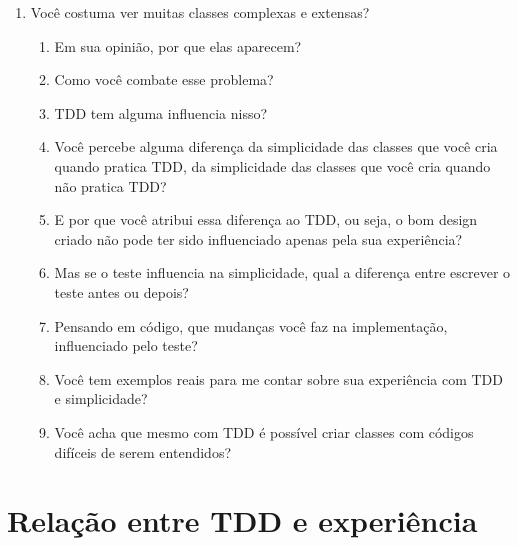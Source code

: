 \begin{enumerate}
	\item{Você costuma ver muitas classes complexas e extensas?}
		\begin{enumerate}
			\item Em sua opinião, por que elas aparecem?

			\item Como você combate esse problema?

			\item TDD tem alguma influencia nisso?
			
			\item Você percebe alguma diferença da simplicidade das classes que você cria quando
			pratica TDD, da simplicidade das classes que você cria quando não pratica TDD?
			
			\item E por que você atribui essa diferença ao TDD, ou seja, o bom design
			criado não pode ter sido influenciado apenas pela sua experiência?
			
			\item Mas se o teste influencia na simplicidade, 
			qual a diferença entre escrever o teste antes ou depois?
			
			\item Pensando em código, que mudanças você faz na implementação, influenciado
			pelo teste?

			\item Você tem exemplos reais para me contar sobre sua experiência com TDD e 
			simplicidade?
			
			\item Você acha que mesmo com TDD é possível criar classes com códigos difíceis de serem entendidos? 

		\end{enumerate}
\end{enumerate}

\section{Relação entre TDD e experiência}
\label{entrevista:experiencia}

